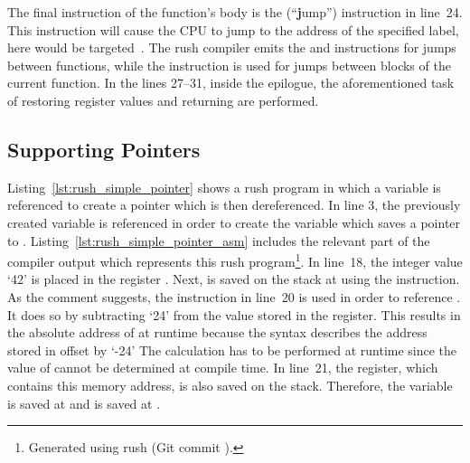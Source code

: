 The final instruction of the  function's body is the  (\enquote{\textbf{j}ump}) instruction in line~24.
This instruction will cause the CPU to jump to the address of the specified label,
here  would be targeted~\cite[p.~17]{Patterson2017}.
The rush compiler emits the  and  instructions for jumps between functions,
while the  instruction is used for jumps between blocks of the current function.
In the lines 27--31, inside the epilogue, the aforementioned task of restoring register values and returning are performed.

\subsection{Supporting Pointers}

\begin{minipage}{.34\textwidth}
	\center
\end{minipage}%
\hspace{3cm}
\begin{minipage}{.45\textwidth}
	\center
	\vspace{.1cm}
\end{minipage}

Listing~\ref{lst:rush_simple_pointer} shows a rush program in which a variable is referenced to create a pointer which is then dereferenced.
In line 3, the previously created variable  is referenced in order to create the variable  which saves a pointer to .
Listing~\ref{lst:rush_simple_pointer_asm} includes the relevant part of the compiler output which represents this rush program\footnote{Generated using rush (Git commit \rushCommit{}).}.
In line~18, the integer value `42' is placed in the register .
Next,  is saved on the stack at  using the  instruction.
As the comment suggests, the instruction in line~20 is used in order to reference .
It does so by subtracting `24' from the value stored in the  register.
This results in the absolute address of  at runtime because the syntax  describes the address stored in  offset by `-24'
The calculation has to be performed at runtime since the value of  cannot be determined at compile time.
In line~21, the  register, which contains this memory address, is also saved on the stack.
Therefore, the  variable is saved at  and  is saved at .

